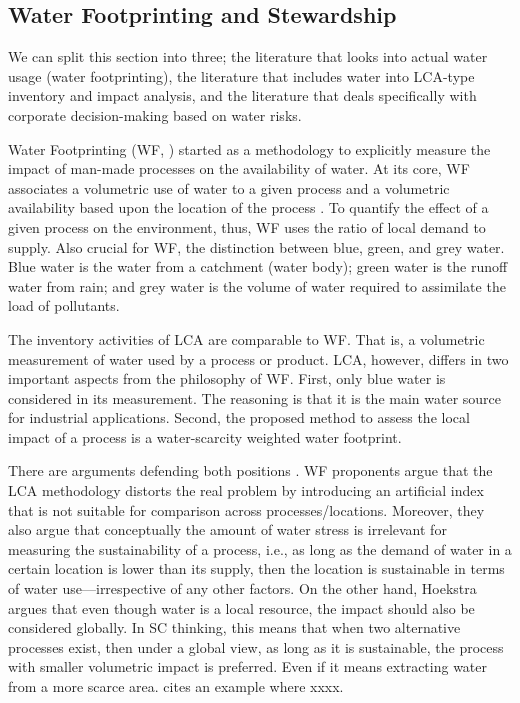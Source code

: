 \documentclass[a4paper]{article}
\begin{document}
\subsection{Water Footprinting and Stewardship}\label{lit:water}
We can split this section into three; the literature that looks into actual water usage (water footprinting), the literature that includes water into LCA-type inventory and impact analysis, and the literature that deals specifically with corporate decision-making based on water risks. 

Water Footprinting (WF, \citet{Hoekstra:2011}) started as a methodology to explicitly measure the impact of man-made processes on the availability of water. 
At its core, WF associates a volumetric use of water to a given process and a volumetric availability based upon the location of the process \citep{Hoekstra:2011}.
To quantify the effect of a given process on the environment, thus, WF uses the ratio of local demand to supply.
Also crucial for WF, the distinction between blue, green, and grey water. 
Blue water is the water from a catchment (water body); green water is the runoff water from rain; and grey water is the volume of water required to assimilate the load of pollutants.

The inventory activities of LCA are comparable to WF. 
That is, a volumetric measurement of water used by a process or product. 
LCA, however, differs in two important aspects from the philosophy of WF. 
First, only blue water is considered in its measurement. 
The reasoning is that it is the main water source for industrial applications.
Second, the proposed method to assess the local impact of a process is a water-scarcity weighted water footprint.

There are arguments defending both positions \citep{Hoekstra:2016, Pfister:2017}.
WF proponents \citep{Hoekstra:2016} argue that the LCA methodology distorts the real problem by introducing an artificial index that is not suitable for comparison across processes/locations.
Moreover, they also argue that conceptually the amount of water stress is irrelevant for measuring the sustainability of a process, i.e., as long as the demand of water in a certain location is lower than its supply, then the location is sustainable in terms of water use---irrespective of any other factors.
On the other hand, Hoekstra argues that even though water is a local resource, the impact should also be considered globally. 
In SC thinking, this means that when two alternative processes exist, then under a global view, as long as it is sustainable, the process with smaller volumetric impact is preferred. 
Even if it means extracting water from a more scarce area. 
\citet{Hoekstra:2016} cites an example where xxxx.    
\end{document}

